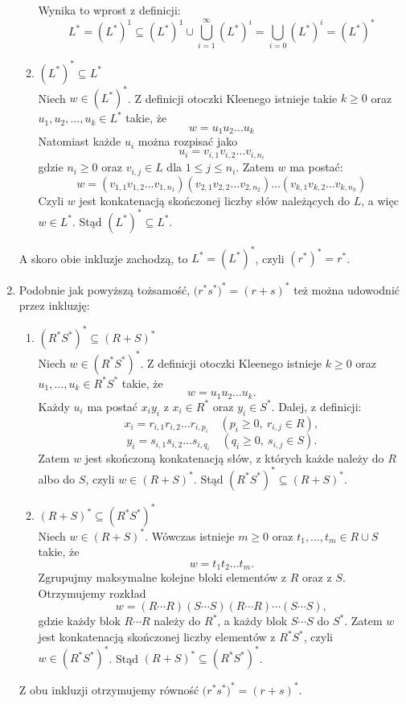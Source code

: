 \documentclass[11pt,a4paper]{article}
\numberwithin{equation}{section}
\begin{document}
\begin{enumerate}
\begin{enumerate}
                Wynika to wprost z definicji:
                \[
                    L^* = (L^*)^1 \subseteq (L^*)^1 \cup \bigcup_{i=1}^{\infty} (L^*)^i  = \bigcup_{i=0}(L^*)^i = (L^*)^*
                \]
            \item $(L^*)^* \subseteq L^*$\\
                Niech $w \in (L^*)^*$. Z definicji otoczki Kleenego istnieje takie $k \geq 0$ oraz $u_1, u_2, \ldots, u_k \in L^*$ takie, że
                \[
                    w = u_1 u_2 \ldots u_k
                \]
                Natomiast każde $u_i$ można rozpisać jako
                \[
                    u_i = v_{i,1} v_{i,2} \dots v_{i,n_i}
                \]
                gdzie $n_i \geq 0$ oraz $v_{i,j} \in L$ dla $1 \leq j \leq n_i$. Zatem $w$ ma postać:
                \[
                    w = (v_{1,1} v_{1,2} \dots v_{1,n_1}) (v_{2,1} v_{2,2} \dots v_{2,n_2}) \ldots (v_{k,1} v_{k,2} \dots v_{k,n_k})
                \]
                Czyli $w$ jest konkatenacją skończonej liczby słów należących do $L$, a więc $w \in L^*$. Stąd $(L^*)^* \subseteq L^*$.
        \end{enumerate}
        A skoro obie inkluzje zachodzą, to $L^* = (L^*)^*$, czyli $(r^*)^* = r^*$.
    \item Podobnie jak powyższą tożsamość, $\big(r^* s^*\big)^* = (r+s)^*$ też można udowodnić przez inkluzję:
        \begin{enumerate}
            \item $(R^*S^*)^* \subseteq (R+S)^*$\\
                Niech $w \in (R^*S^*)^*$. Z definicji otoczki Kleenego istnieje $k \ge 0$ oraz $u_1,\dots,u_k \in R^*S^*$ takie, że
                \[
                    w = u_1 u_2 \dots u_k.
                \]
                Każdy $u_i$ ma postać $x_i y_i$ z $x_i \in R^*$ oraz $y_i \in S^*$. Dalej, z definicji:
                \[
                    x_i = r_{i,1} r_{i,2} \dots r_{i,p_i}\quad (p_i\ge 0,\ r_{i,j}\in R),
                \]
                \[
                    y_i = s_{i,1} s_{i,2} \dots s_{i,q_i}\quad (q_i\ge 0,\ s_{i,j}\in S).
                \]
                Zatem $w$ jest skończoną konkatenacją słów, z których każde należy do $R$ albo do $S$, czyli $w \in (R+S)^*$. Stąd $(R^*S^*)^* \subseteq (R+S)^*$.

            \item $(R+S)^* \subseteq (R^*S^*)^*$\\
                Niech $w \in (R+S)^*$. Wówczas istnieje $m \ge 0$ oraz $t_1,\dots,t_m \in R\cup S$ takie, że
                \[
                    w = t_1 t_2 \dots t_m.
                \]
                Zgrupujmy maksymalne kolejne bloki elementów z $R$ oraz z $S$. Otrzymujemy rozkład
                \[
                    w = (R\cdots R)(S\cdots S)(R\cdots R)\cdots(S\cdots S),
                \]
                gdzie każdy blok $R\cdots R$ należy do $R^*$, a każdy blok $S\cdots S$ do $S^*$. Zatem $w$ jest konkatenacją skończonej liczby elementów z $R^*S^*$, czyli $w \in (R^*S^*)^*$. Stąd $(R+S)^* \subseteq (R^*S^*)^*$.
        \end{enumerate}
        Z obu inkluzji otrzymujemy równość $\big(r^* s^*\big)^* = (r+s)^*$.
\end{enumerate}
\end{document}
